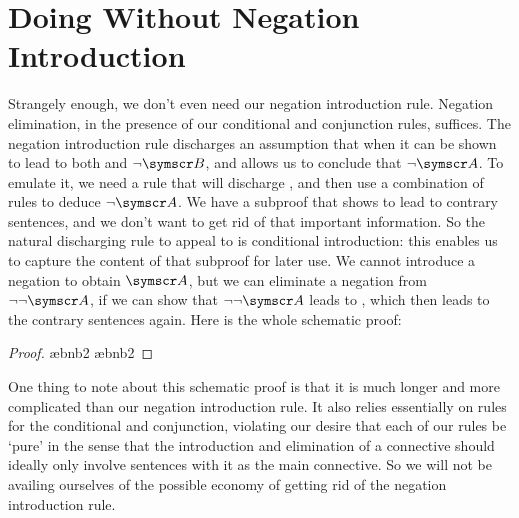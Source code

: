 \section{Doing Without Negation Introduction} 

Strangely enough, we don't even need our negation introduction rule. Negation elimination, in the presence of our conditional and conjunction rules, suffices. The negation introduction rule discharges an assumption that  when it can be shown to lead to both  and $\enot\meta{B}$, and allows us to conclude that $\enot\meta{A}$. To emulate it, we need a rule that will discharge , and then use a combination of rules to deduce $\enot\meta{A}$. We have a subproof that shows  to lead to contrary sentences, and we don't want to get rid of that important information. So the natural discharging rule to appeal to is conditional introduction: this enables us to capture the content of that subproof for later use. We cannot introduce a negation to obtain $\meta{A}$, but we can eliminate a negation from $\enot\enot\meta{A}$, if we can show that $\enot\enot\meta{A}$ leads to , which then leads to the contrary sentences again. Here is the whole schematic proof:
\begin{proof}
	\have[\ ]{}{\vdots}
	\open
	\have[\ ]{}{\vdots}
	\close
	\open
	\open
	\close
	\ae{bnb2}
	\ae{bnb2}
	\close
\end{proof}
One thing to note about this schematic proof is that it is much longer and more complicated than our negation introduction rule. It also relies essentially on rules for the conditional and conjunction, violating our desire that each of our rules be `pure' in the sense that the introduction and elimination of a connective should ideally only involve sentences with it as the main connective. So we will not be availing ourselves of the possible economy of getting rid of the negation introduction rule.

